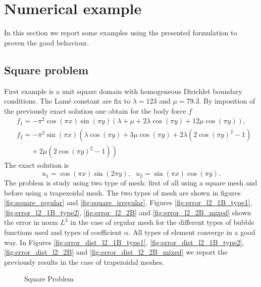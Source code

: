 \documentclass[preprint,12pt,authoryear]{elsarticle}
\begin{document}
\section{Numerical example}\label{sec:five}
In this section we report some examples using the presented formulation to proven the good behaviour. 

\subsection{Square problem}
First example is a unit square domain with homogeneous Dirichlet boundary conditions.
The Lamé constant are fix to $\lambda = 123$ and $\mu=79.3$.
By imposition of the previously exact solution one obtain for the body force $f$
\begin{equation}
\begin{split}
&f_{1} = -\pi^{2} \cos(\pi x) \sin(\pi y) \left( \lambda + \mu + 2\lambda\cos(\pi y) + 
12\mu\cos(\pi y)\right), \\
&f_{2} = -\pi^{2}\sin(\pi x)\left( \lambda\cos(\pi y) + 3\mu\cos(\pi y) + 2\lambda\left(2\cos(\pi y)^{2} 
- 1\right) \right.\\
&\left. \hspace{24pt} + 2\mu\left(2\cos(\pi y)^{2} - 1\right) \right)
\end{split}
\end{equation}
The exact solution is
\begin{equation} \label{eq:exact_solution}
u_{1} = \cos (\pi x) \sin(2\pi y), \mbox{ } u_{2} = \sin(\pi x)\cos(\pi y). 
\end{equation} 
The problem is study using two type of mesh: first of all using a square mesh and before using a trapezoidal mesh. The two types of mesh are shown in figures \ref{fig:square_regular} and \ref{fig:square_irregular}.
Figures \ref{fig:error_l2_1B_type1}, \ref{fig:error_l2_1B_type2}, \ref{fig:error_l2_2B} and \ref{fig:error_l2_2B_mixed} shown the error in norm $L^{2}$ in the case of regular mesh for the different types of bubble functions used and types of coefficient $\alpha$. All types of element converge in a good way.
In Figures  \ref{fig:error_dist_l2_1B_type1}, \ref{fig:error_dist_l2_1B_type2}, \ref{fig:error_dist_l2_2B} and \ref{fig:error_dist_l2_2B_mixed} we report the previously results in the case of trapezoidal meshes. 
%
\begin{figure}[h!]
\begin{center}
\hspace{5pt}
\caption{Square Problem}
\end{center}
\end{figure}
\end{document}
